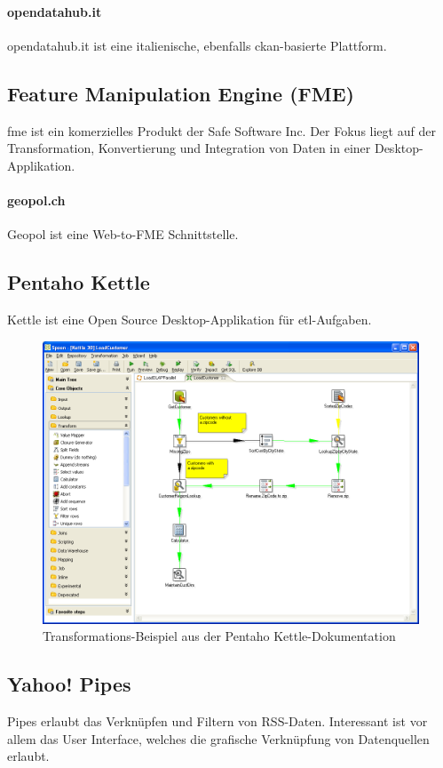 \paragraph{opendatahub.it}
opendatahub.it ist eine italienische, ebenfalls \gls{ckan}-basierte Plattform.

\subsection{Feature Manipulation Engine (FME)}
\gls{fme} ist ein komerzielles Produkt der Safe Software Inc. Der Fokus liegt auf der Transformation, Konvertierung und Integration von Daten in einer Desktop-Applikation.

\paragraph{geopol.ch}
Geopol ist eine Web-to-FME Schnittstelle.

\subsection{Pentaho Kettle}
Kettle ist eine Open Source Desktop-Applikation für \acs{etl}-Aufgaben.

\begin{figure}[H]
    \centering
    \includegraphics[width=2\linewidth/3]{fig/kettle-spoon-transformation}
    \caption{Transformations-Beispiel aus der Pentaho Kettle-Dokumentation}
\end{figure}

\subsection{Yahoo! Pipes}
Pipes erlaubt das Verknüpfen und Filtern von RSS-Daten. Interessant ist vor allem das User Interface, welches die grafische Verknüpfung von Datenquellen erlaubt.

